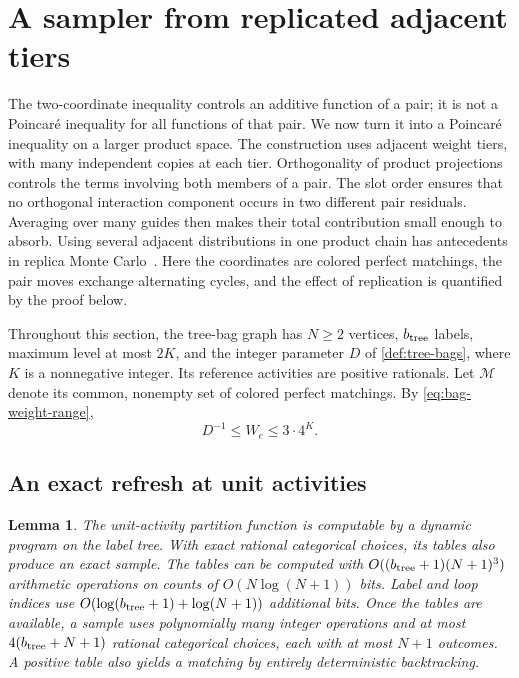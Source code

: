 \documentclass[11pt]{article}
\newtheorem{lemma}[theorem]{Lemma}
\theoremstyle{definition}
\theoremstyle{remark}
\newcommand{\calM}{\mathcal M}
\numberwithin{equation}{section}
\begin{document}
\section{A sampler from replicated adjacent tiers}
\label{sec:ladder}

The two-coordinate inequality controls an additive function of a pair;
it is not a Poincar\'e inequality for all functions of that pair.
We now turn it into a Poincar\'e inequality on a larger product space.
The construction uses adjacent weight tiers, with many independent
copies at each tier. Orthogonality of product projections controls the
terms involving both members of a pair. The slot order ensures that
no orthogonal interaction component occurs in two different pair
residuals. Averaging over many guides then makes their total
contribution small enough to absorb. Using several adjacent
distributions in one product chain has antecedents in replica Monte
Carlo~\cite{SwendsenWang1986,WangSwendsen2005}. Here the coordinates
are colored perfect matchings, the pair moves exchange alternating
cycles, and the effect of replication is quantified by the proof below.

Throughout this section, the tree-bag graph has $N\ge2$ vertices,
$b_{\rm tree}$ labels, maximum level at most $2K$, and the integer
parameter $D$ of \cref{def:tree-bags}, where $K$ is a nonnegative integer.
Its reference activities are
positive rationals. Let $\calM$ denote its common, nonempty set of
colored perfect matchings. By \cref{eq:bag-weight-range},
\begin{equation}\label{eq:ladder-global-range}
  D^{-1}\le W_e\le 3\cdot4^K.
\end{equation}

\subsection{An exact refresh at unit activities}

\begin{lemma}\label{lem:base-refresh}
The unit-activity partition function is computable by a dynamic program
on the label tree. With exact rational categorical choices, its tables
also produce an exact sample. The tables
can be computed with $O((b_{\rm tree}+1)(N+1)^3)$ arithmetic
operations on counts of $O(N\log(N+1))$ bits. Label and loop indices
use $O(\log(b_{\rm tree}+1)+\log(N+1))$ additional bits. Once the tables are
available, a sample uses polynomially many integer operations and at
most $4(b_{\rm tree}+N+1)$ rational categorical choices, each with at
most $N+1$ outcomes. A positive table also yields a matching by
entirely deterministic backtracking.
\end{lemma}
\end{document}
